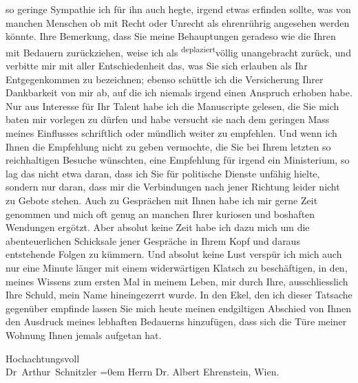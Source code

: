                so geringe Sympathie ich für ihn auch hegte, irgend etwas erfinden sollte, was von
               manchen Menschen ob mit Recht oder Unrecht als ehrenrührig angesehen werden könnte.
               Ihre Bemerkung, dass Sie meine Behauptungen geradeso wie die Ihren mit Bedauern
               zurückziehen, weise ich als \substVorne{}\textsuperscript{deplaziert}\substDazwischen{}völlig unangebracht\substHinten{} zurück, und verbitte mir mit aller Ent{\pb}schiedenheit
               das, was Sie sich erlauben als Ihr Entgegenkommen zu bezeichnen; ebenso schüttle ich
               die Versicherung Ihrer Dankbarkeit von mir ab, auf die ich niemals irgend einen
               Anspruch erhoben habe. Nur aus Interesse für Ihr Talent habe ich die Manuscripte
               gelesen, die Sie mich baten mir vorlegen zu dürfen und \introOben{}habe\introOben{}
               versucht sie nach dem geringen Mass meines Einflusses schriftlich oder mündlich
               weiter zu empfehlen. Und wenn ich Ihnen die Empfehlung nicht zu geben vermochte, die
               Sie bei Ihrem letzten so reichhaltigen Besuche wünschten, eine Empfehlung für irgend
               ein Ministerium, so lag das nicht etwa daran, dass ich Sie für politische Dienste
                   unfähig hielte, sondern nur daran, dass mir
               die Verbindungen nach jener Richtung leider nicht zu Gebote stehen. Auch zu
               Gesprächen mit Ihnen habe ich mir gerne Zeit genommen und mich oft genug an manchen
               Ihrer kuriosen und boshaften Wendungen ergötzt. Aber absolut keine Zeit habe ich dazu
               mich um die abenteuerlichen Schicksale jener Gespräche in Ihrem Kopf und daraus
               entstehende Fol{\pb}gen zu kümmern. Und absolut keine Lust verspür
               ich mich auch nur eine Minute länger mit einem widerwärtigen Klatsch zu beschäftigen,
               in den, meines Wissens zum ersten Mal in meinem Leben, \introOben{}mir
                  durch\introOben{} Ihre, ausschliesslich Ihre Schuld, mein Name hineingezerrt wurde. In
               den Ekel, den ich dieser Tatsache gegenüber empfinde lassen Sie mich heute meinen
               endgiltigen Abschied von Ihnen den Ausdruck meines lebhaften Bedauerns hinzufügen,
               dass sich die Türe meiner Wohnung Ihnen jemals aufgetan hat.\pend
           
\pstart
           Hochachtungsvoll{\\[\baselineskip]}\spacefill\mbox{Dr Arthur Schnitzler}\pend
           \leftskip=0em{}
\pstart
           \noindent{}Herrn Dr. Albert Ehrenstein, Wien.\pend
           \endnumbering{}  \newcommand{\dateiname}{L02019}\newcommand{\titel}{Arthur Schnitzler an Albert Ehrenstein, 6. 5. 1911}\newcommand{\editorInnen}{Martin Anton Müller und Gerd-Hermann Susen}
